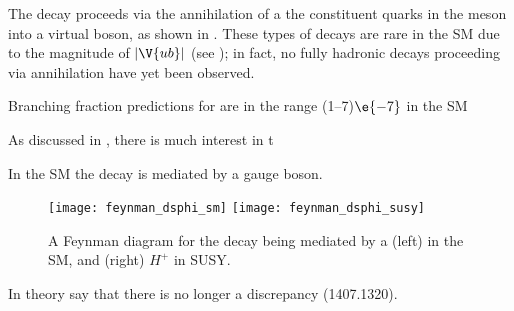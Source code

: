 The decay \btodsphi proceeds via the annihilation of a the constituent quarks in the \Bp meson into
a virtual \Wp boson, as shown in .
These types of decays are rare in the SM due to the magnitude of $|\V{ub}|$ (see );
in fact, no fully hadronic decays proceeding via annihilation have yet been observed.

Branching fraction predictions for \btodsphi are in the range (1--7)$\e{-7}$ in the SM
\cite{Zou:2009zza,Mohanta:2002wf,PhysRevD.76.057701,Lu:2001yz}

As discussed in , there is much interest in t



In the SM the decay is mediated by a \Wp gauge boson.

\begin{figure}
  \begin{center}
    \texttt{[image: feynman\_dsphi\_sm]}
    \texttt{[image: feynman\_dsphi\_susy]}
    \caption{\small
      A Feynman diagram for the decay \btodsphi being mediated by a
      (left) \Wp in the SM, and
      (right) $H^+$ in SUSY.
    }
    \label{fig:dsphi:feyn}
  \end{center}
\end{figure}


























In theory say that there is no longer a discrepancy (1407.1320).
\cite{PDG2012}
